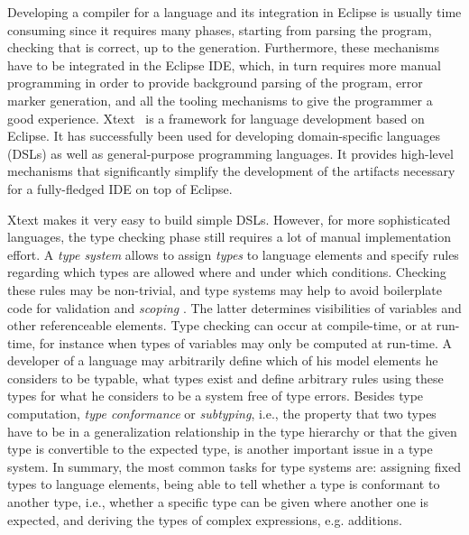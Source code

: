 Developing a compiler for a language  and its integration in Eclipse is
usually time consuming since it requires many phases, starting from parsing the
program, checking that is correct, up to the generation. Furthermore, these
mechanisms have to be integrated in the Eclipse IDE, which, in turn requires
more manual programming in order to provide background parsing of the program,
error marker generation, and all the tooling mechanisms to give the programmer a
good experience.  Xtext~\cite{xtext} is a
framework for language development based on Eclipse. It has successfully been
used for developing domain-specific languages (DSLs) as well as general-purpose
programming languages. It provides high-level mechanisms that significantly
simplify the development of the artifacts necessary for a fully-fledged IDE on
top of Eclipse.

Xtext makes it very easy to build simple DSLs. However, for more sophisticated
languages, the type checking phase still requires a lot of manual implementation
effort. A \emph{type system} allows to assign \emph{types} to language elements
and specify rules regarding which types are allowed where and under which
conditions. Checking these rules may be non-trivial, and type systems may help
to avoid boilerplate code for validation and \emph{scoping} .
The latter determines visibilities of variables and other referenceable
elements.  Type checking can
occur at compile-time, or at run-time, for instance when types of variables may
only be computed at run-time.  A developer of a language may
arbitrarily define which of his model elements he considers to be typable, what
types exist and define arbitrary rules using these types for what he considers
to be a system free of type errors.
Besides type computation, \emph{type conformance} or \emph{subtyping}, i.e., the
property that two types have to be in a generalization relationship in the type
hierarchy or that the given type is convertible to the expected type, is another
important issue in a type system.
In summary, the most common tasks for type systems are:
assigning fixed types to language elements, being able to tell whether a type is
conformant to another type, i.e., whether a specific type can be given where
another one is expected, and deriving the types of complex expressions, e.g.
additions.

